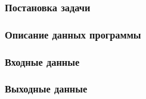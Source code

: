 \subsubsection{Постановка задачи}


\subsubsection{Описание данных программы}


\subsubsection{Входные данные}


\subsubsection{Выходные данные}

